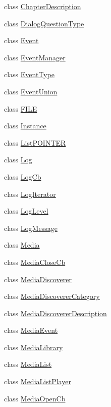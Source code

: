 \begin{DoxyCompactItemize}
\item 
class \hyperlink{classvlc_1_1_chapter_description}{Chapter\+Description}
\item 
class \hyperlink{classvlc_1_1_dialog_question_type}{Dialog\+Question\+Type}
\item 
class \hyperlink{classvlc_1_1_event}{Event}
\item 
class \hyperlink{classvlc_1_1_event_manager}{Event\+Manager}
\item 
class \hyperlink{classvlc_1_1_event_type}{Event\+Type}
\item 
class \hyperlink{classvlc_1_1_event_union}{Event\+Union}
\item 
class \hyperlink{classvlc_1_1_f_i_l_e}{F\+I\+LE}
\item 
class \hyperlink{classvlc_1_1_instance}{Instance}
\item 
class \hyperlink{classvlc_1_1_list_p_o_i_n_t_e_r}{List\+P\+O\+I\+N\+T\+ER}
\item 
class \hyperlink{classvlc_1_1_log}{Log}
\item 
class \hyperlink{classvlc_1_1_log_cb}{Log\+Cb}
\item 
class \hyperlink{classvlc_1_1_log_iterator}{Log\+Iterator}
\item 
class \hyperlink{classvlc_1_1_log_level}{Log\+Level}
\item 
class \hyperlink{classvlc_1_1_log_message}{Log\+Message}
\item 
class \hyperlink{classvlc_1_1_media}{Media}
\item 
class \hyperlink{classvlc_1_1_media_close_cb}{Media\+Close\+Cb}
\item 
class \hyperlink{classvlc_1_1_media_discoverer}{Media\+Discoverer}
\item 
class \hyperlink{classvlc_1_1_media_discoverer_category}{Media\+Discoverer\+Category}
\item 
class \hyperlink{classvlc_1_1_media_discoverer_description}{Media\+Discoverer\+Description}
\item 
class \hyperlink{classvlc_1_1_media_event}{Media\+Event}
\item 
class \hyperlink{classvlc_1_1_media_library}{Media\+Library}
\item 
class \hyperlink{classvlc_1_1_media_list}{Media\+List}
\item 
class \hyperlink{classvlc_1_1_media_list_player}{Media\+List\+Player}
\item 
class \hyperlink{classvlc_1_1_media_open_cb}{Media\+Open\+Cb}
\item 

\end{DoxyCompactItemize}
